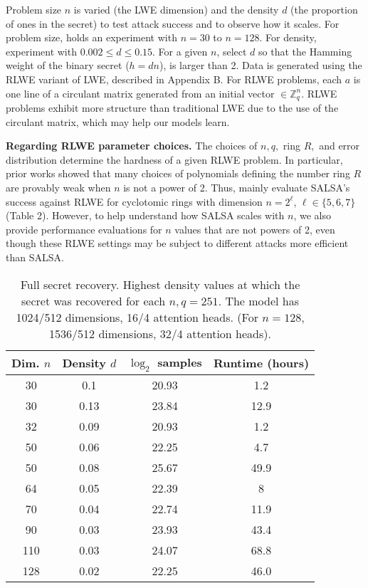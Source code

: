 \documentclass{article}
\begin{document}
Problem size \( n \) is varied (the LWE dimension) and the density \( d \) (the proportion of ones in the secret) to test attack success and to observe how it scales. For problem size, holds an experiment with \( n = 30 \) to \( n = 128 \). For density, experiment with \( 0.002 \leq d \leq 0.15 \). For a given \( n \), select \( d \) so that the Hamming weight of the binary secret (\( h = dn \)), is larger than 2. Data is generated using the RLWE variant of LWE, described in Appendix B. For RLWE problems, each \( a \) is one line of a circulant matrix generated from an initial vector \( \in \mathbb{Z}_q^n \). RLWE problems exhibit more structure than traditional LWE due to the use of the circulant matrix, which may help our models learn.

\textbf{Regarding RLWE parameter choices.} The choices of \( n, q, \) ring \( R, \) and error distribution determine the hardness of a given RLWE problem. In particular, prior works showed that many choices of polynomials defining the number ring \( R \) are provably weak when \( n \) is not a power of 2. Thus, mainly evaluate SALSA’s success against RLWE for cyclotomic rings with dimension \( n = 2^\ell \), \( \ell \in \{5, 6, 7\} \) (Table 2). However, to help understand how SALSA scales with \( n \), we also provide performance evaluations for \( n \) values that are not powers of 2, even though these RLWE settings may be subject to different attacks more efficient than SALSA.

\begin{table}[h]
    \centering
    \begin{tabular}{|c|c|c|c|}
    \hline
    Dim. \( n \) & Density \( d \) & \( \log_2 \) samples & Runtime (hours) \\
    \hline
    30 & 0.1 & 20.93 & 1.2 \\
    30 & 0.13 & 23.84 & 12.9 \\
    32 & 0.09 & 20.93 & 1.2 \\
    50 & 0.06 & 22.25 & 4.7 \\
    50 & 0.08 & 25.67 & 49.9 \\
    64 & 0.05 & 22.39 & 8 \\
    70 & 0.04 & 22.74 & 11.9 \\
    90 & 0.03 & 23.93 & 43.4 \\
    110 & 0.03 & 24.07 & 68.8 \\
    128 & 0.02 & 22.25 & 46.0 \\
    \hline
    \end{tabular}
    \caption{Full secret recovery. Highest density values at which the secret was recovered for each \( n, q = 251 \). The model has 1024/512 dimensions, 16/4 attention heads. (For \( n = 128 \), 1536/512 dimensions, 32/4 attention heads).}
    \end{table}
    
\end{document}
